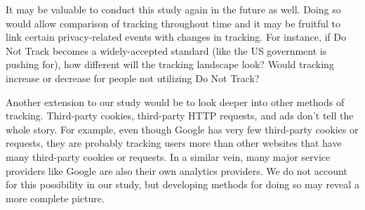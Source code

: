 \documentclass[12pt,draft,onecolumn]{IEEEtran}
\begin{document}
It may be valuable to conduct this study again in the future as well. Doing so would allow comparison of tracking throughout time and it may be fruitful to link certain privacy-related events with changes in tracking. For instance, if Do Not Track becomes a widely-accepted standard (like the US government is pushing for), how different will the tracking landscape look? Would tracking increase or decrease for people not utilizing Do Not Track?

Another extension to our study would be to look deeper into other methods of tracking. Third-party cookies, third-party HTTP requests, and ads don't tell the whole story. For example, even though Google has very few third-party cookies or requests, they are probably tracking users more than other websites that have many third-party cookies or requests. In a similar vein, many major service providers like Google are also their own analytics providers. We do not account for this possibility in our study, but developing methods for doing so may reveal a more complete picture.



%


\end{document}
